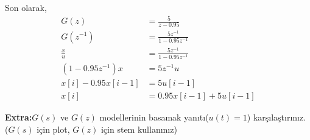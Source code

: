 Son olarak,
\begin{equation}
    \begin{split}
        G(z)&=\frac{5}{z-0.95}\\
        G(z^{-1})&=\frac{5z^{-1}}{1-0.95z^{-1}}\\
        \frac{x}{u}&=\frac{5z^{-1}}{1-0.95z^{-1}}\\
        (1-0.95z^{-1})x&=5z^{-1}u\\
        x[i]-0.95x[i-1]&=5u[i-1]\\
        x[i]&=0.95x[i-1]+5u[i-1]
    \end{split}
\end{equation}

\noindent\textbf{Extra:}$G(s)$ ve $G(z)$ modellerinin basamak yanıtı($u(t)=1$) karşılaştırınız. ($G(s)$ için plot, $G(z)$ için stem kullanınız)

